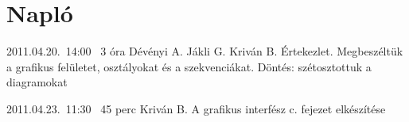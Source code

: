 %
\section{Napló}

\begin{naplo}

\bejegyzes
{2011.04.20.~14:00~} %
{3 óra} %
{Dévényi A.\newline
Jákli G.\newline
Kriván B.} %
{Értekezlet.\newline
Megbeszéltük a grafikus felületet, osztályokat és a szekvenciákat.
Döntés: szétosztottuk a diagramokat} %

\bejegyzes
{2011.04.23.~11:30~}
{45 perc}
{Kriván B.}
{A grafikus interfész c. fejezet elkészítése}


\end{naplo}

